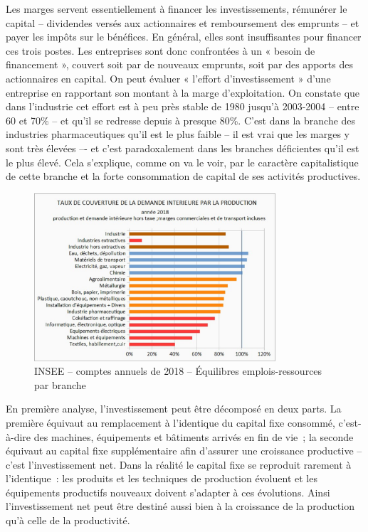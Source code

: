 \documentclass[a4paper]{article}
\begin{document}
Les marges servent essentiellement à financer les investissements, rémunérer le capital – dividendes versés aux actionnaires et remboursement des emprunts – et payer les impôts sur le bénéfices. En général, elles sont insuffisantes pour financer ces trois postes. Les entreprises sont donc confrontées à un « besoin de financement », couvert soit par de nouveaux emprunts, soit par des apports des actionnaires en capital. On peut évaluer « l’effort d’investissement » d’une entreprise en rapportant son montant à la marge d’exploitation. On constate que dans l’industrie cet effort est à peu près stable de 1980 jusqu’à 2003-2004 – entre 60 et 70\% –  et qu’il se redresse depuis à presque 80\%. C’est dans la branche des industries pharmaceutiques qu’il est le plus faible – il est vrai que les marges y sont très élevées –- et c’est paradoxalement dans les branches déficientes qu’il est le plus élevé. Cela s’explique, comme on va le voir, par le caractère capitalistique de cette branche et la forte consommation de capital de ses activités productives.

\begin{figure}[H]
    \centering
    \includegraphics*[width=0.8\textwidth]{images/couverture}
    \caption{INSEE – comptes annuels de 2018 – Équilibres emplois-ressources par branche}
    \label{fig:couverture}
\end{figure}

En première analyse, l’investissement peut être décomposé en deux parts. La première équivaut au remplacement à l’identique du capital fixe consommé, c’est-à-dire des machines, équipements et bâtiments arrivés en fin de vie~; la seconde équivaut au capital fixe supplémentaire afin d’assurer une croissance productive – c’est l’investissement net. Dans la réalité le capital fixe se reproduit rarement à l’identique~: les produits et les techniques de production évoluent et les équipements productifs nouveaux doivent s’adapter à ces évolutions. Ainsi l’investissement  net  peut être destiné aussi bien à la croissance de la production qu’à celle de la productivité.
\end{document}
